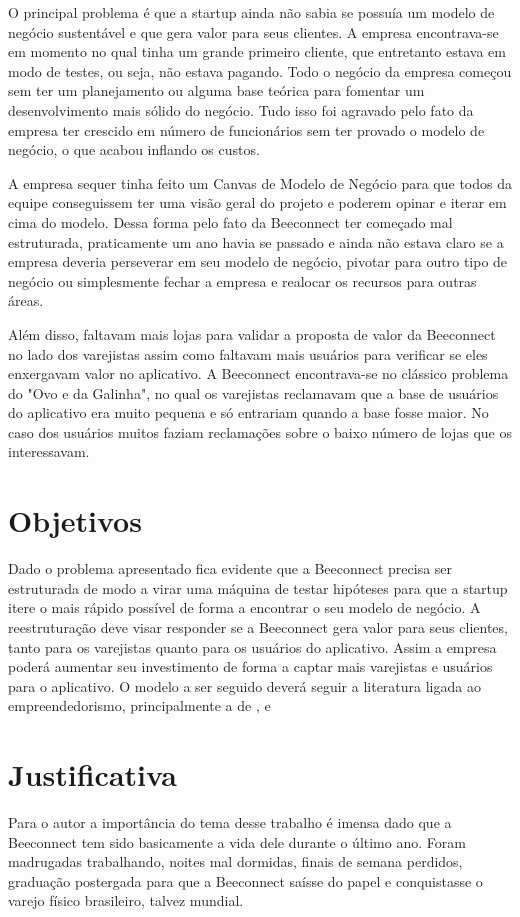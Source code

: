 O principal problema é que a startup ainda não sabia se possuía um modelo de negócio sustentável e que gera valor para seus clientes. A empresa encontrava-se em momento no qual tinha um grande primeiro cliente, que entretanto estava em modo de testes, ou seja, não estava pagando.
Todo o negócio da empresa começou sem ter um planejamento ou alguma base teórica para fomentar um desenvolvimento mais sólido do negócio. Tudo isso foi agravado pelo fato da empresa ter crescido em número de funcionários sem ter provado o modelo de negócio, o que acabou inflando os custos.

A empresa sequer tinha feito um Canvas de Modelo de Negócio para que todos da equipe conseguissem ter uma visão geral do projeto e poderem opinar e iterar em cima do modelo. Dessa forma pelo fato da Beeconnect ter começado mal estruturada, praticamente um ano havia se passado e ainda não estava claro se a empresa deveria perseverar em seu modelo de negócio, pivotar para outro tipo de negócio ou simplesmente fechar a empresa e realocar os recursos para outras áreas.

Além disso, faltavam mais lojas para validar a proposta de valor da Beeconnect no lado dos varejistas assim como faltavam mais usuários para verificar se eles enxergavam valor no aplicativo. A Beeconnect encontrava-se no clássico problema do "Ovo e da Galinha", no qual os varejistas reclamavam que a base de usuários do aplicativo era muito pequena e só entrariam quando a base fosse maior. No caso dos usuários muitos faziam reclamações sobre o baixo número de lojas que os interessavam.

\section[Objetivos]{Objetivos}
\label{chap:objetivos}
Dado o problema apresentado fica evidente que a Beeconnect precisa ser estruturada de modo a virar uma máquina de testar hipóteses para que a startup itere o mais rápido possível de forma a encontrar o seu modelo de negócio.
A reestruturação deve visar responder se a Beeconnect gera valor para seus clientes, tanto para os varejistas quanto para os usuários do aplicativo. Assim a empresa poderá aumentar seu investimento de forma a captar mais varejistas e usuários para o aplicativo. O modelo a ser seguido deverá seguir a literatura ligada ao empreendedorismo, principalmente a de ,  e 

\section{Justificativa}
\label{cha:justificativa}
Para o autor a importância do tema desse trabalho é imensa dado que a Beeconnect tem sido basicamente a vida dele durante o último ano. Foram madrugadas trabalhando, noites mal dormidas, finais de semana perdidos, graduação postergada para que a Beeconnect saísse do papel e conquistasse o varejo físico brasileiro, talvez mundial.

